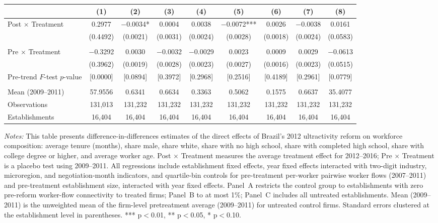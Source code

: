 \begin{table}[]
\begin{threeparttable}
{\begin{tabular}{lcccccccc}
 & (1) & (2) & (3) & (4) & (5) & (6) & (7) & (8) \\
\midrule
Post $\times$ Treatment & 0.2977 & $-$0.0034* & 0.0004 & 0.0038 & $-$0.0072*** & 0.0026 & $-$0.0038 & 0.0161 \\
  & (0.4492) & (0.0021) & (0.0031) & (0.0024) & (0.0028) & (0.0018) & (0.0024) & (0.0583) \\
  &  &  &  &  &  &  &  & \\
Pre $\times$ Treatment & $-$0.3292 & 0.0030 & $-$0.0032 & $-$0.0029 & 0.0023 & 0.0009 & 0.0029 & $-$0.0613 \\
  & (0.3962) & (0.0019) & (0.0028) & (0.0023) & (0.0027) & (0.0016) & (0.0023) & (0.0515) \\
Pre-trend $F$-test $p$-value & [0.0000] & [0.0894] & [0.3972] & [0.2968] & [0.2516] & [0.4189] & [0.2961] & [0.0779] \\
  &  &  &  &  &  &  &  & \\
Mean (2009--2011) & 57.9556 & 0.6341 & 0.6634 & 0.3363 & 0.5062 & 0.1575 & 0.6637 & 35.4077 \\
Observations & 131{,}013 & 131{,}232 & 131{,}232 & 131{,}232 & 131{,}232 & 131{,}232 & 131{,}232 & 131{,}232 \\
Establishments & 16{,}404 & 16{,}404 & 16{,}404 & 16{,}404 & 16{,}404 & 16{,}404 & 16{,}404 & 16{,}404 \\
\bottomrule
\end{tabular}%
}
\scriptsize
\begin{tablenotes}
\item \textit{Notes:} This table presents difference-in-differences estimates of the direct effects of Brazil's 2012 ultractivity reform on workforce composition: average tenure (months), share male, share white, share with no high school, share with completed high school, share with college degree or higher, and average worker age. Post $\times$ Treatment measures the average treatment effect for 2012--2016; Pre $\times$ Treatment is a placebo test using 2009--2011. All regressions include establishment fixed effects, year fixed effects interacted with two-digit industry, microregion, and negotiation-month indicators, and quartile-bin controls for pre-treatment per-worker pairwise worker flows (2007--2011) and pre-treatment establishment size, interacted with year fixed effects. Panel~A restricts the control group to establishments with zero pre-reform worker-flow connectivity to treated firms; Panel~B to at most 1\%; Panel~C includes all untreated establishments. Mean (2009--2011) is the unweighted mean of the firm-level pretreatment average (2009--2011) for untreated control firms. Standard errors clustered at the establishment level in parentheses. *** p$<$0.01, ** p$<$0.05, * p$<$0.10.
\end{tablenotes}
\end{threeparttable}
\end{table}


